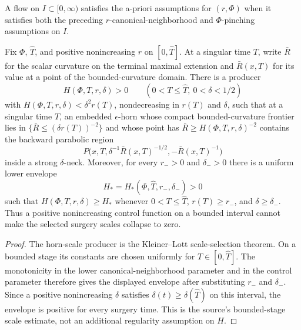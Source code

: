 \begin{definition}
\label{def:ricci-flow-surgery-a-priori-assumptions}
\notready
A flow on $I\subset[0,\infty)$ satisfies the a-priori assumptions for $(r,\Phi)$
when it satisfies both the preceding $r$-canonical-neighborhood and
$\Phi$-pinching assumptions on $I$.
\end{definition}

\begin{lemma}
\label{lem:ricci-flow-surgery-horn-scale}
\notready
Fix $\Phi$, $\widehat T$, and positive nonincreasing $r$ on
$[0,\widehat T]$.  At a singular time $T$, write $\bar R$ for the scalar
curvature on the terminal maximal extension and $\bar R(x,T)$ for its value
at a point of the bounded-curvature domain.  There is a producer
\[
 H(\Phi,T,r,\delta)>0\qquad(0<T\le\widehat T,\ 0<\delta<1/2)
\]
with $H(\Phi,T,r,\delta)<\delta^2r(T)$, nondecreasing in $r(T)$ and $\delta$,
such that at a singular time $T$, an embedded $\epsilon$-horn whose compact
bounded-curvature frontier lies in $\{\bar R\le(\delta r(T))^{-2}\}$ and whose
point has $\bar R\ge H(\Phi,T,r,\delta)^{-2}$ contains the backward parabolic
region
\[
 P\bigl(x,T,\delta^{-1}\bar R(x,T)^{-1/2},-\bar R(x,T)^{-1}\bigr)
\]
inside a strong $\delta$-neck.
Moreover, for every $r_->0$ and $\delta_->0$ there is a uniform lower
envelope
\[
 H_*=H_*(\Phi,\widehat T,r_-,\delta_-)>0
\]
such that $H(\Phi,T,r,\delta)\ge H_*$ whenever
$0<T\le\widehat T$, $r(T)\ge r_-$, and $\delta\ge\delta_-$.  Thus a
positive nonincreasing control function on a bounded interval cannot make the
selected surgery scales collapse to zero.
\end{lemma}

\begin{proof}
The horn-scale producer is the Kleiner--Lott scale-selection theorem.  On a
bounded stage its constants are chosen uniformly for $T\in[0,\widehat T]$.
The monotonicity in the lower canonical-neighborhood parameter and in the
control parameter therefore gives the displayed envelope after substituting
$r_-$ and $\delta_-$.  Since a positive nonincreasing $\delta$ satisfies
$\delta(t)\ge\delta(\widehat T)$ on this interval, the envelope is positive
for every surgery time.  This is the source's bounded-stage scale estimate,
not an additional regularity assumption on $H$.
\end{proof}

